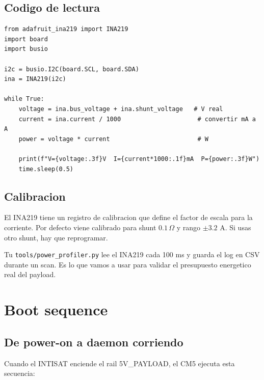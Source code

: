 \documentclass[11pt,a4paper,oneside,openright]{book}
\begin{document}
\section{Codigo de lectura}

\begin{lstlisting}
from adafruit_ina219 import INA219
import board
import busio

i2c = busio.I2C(board.SCL, board.SDA)
ina = INA219(i2c)

while True:
    voltage = ina.bus_voltage + ina.shunt_voltage   # V real
    current = ina.current / 1000                     # convertir mA a A
    power = voltage * current                        # W

    print(f"V={voltage:.3f}V  I={current*1000:.1f}mA  P={power:.3f}W")
    time.sleep(0.5)
\end{lstlisting}

\section{Calibracion}

El INA219 tiene un registro de calibracion que define el factor de
escala para la corriente. Por defecto viene calibrado para shunt
$0.1\,\Omega$ y rango $\pm 3.2$ A. Si usas otro shunt, hay que reprogramar.

\begin{payload}
Tu \texttt{tools/power\_profiler.py} lee el INA219 cada 100 ms y guarda
el log en CSV durante un scan. Es lo que vamos a usar para validar el
presupuesto energetico real del payload.
\end{payload}

\chapter{Boot sequence}
\label{ch:boot}

\section{De power-on a daemon corriendo}

Cuando el INTISAT enciende el rail 5V\_PAYLOAD, el CM5 ejecuta esta
secuencia:
\end{document}
